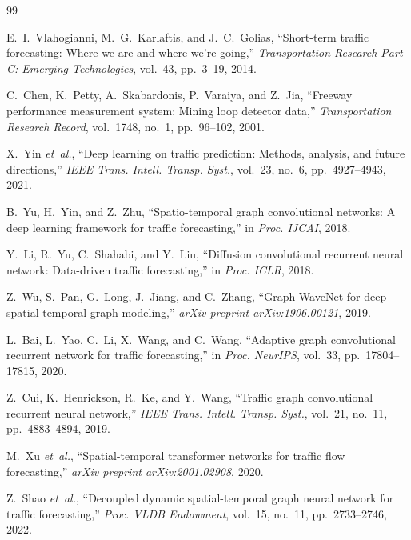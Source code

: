 \documentclass[journal]{IEEEtran}
\begin{document}

% 

\begin{thebibliography}{99}

E.~I.~Vlahogianni, M.~G.~Karlaftis, and J.~C.~Golias,
``Short-term traffic forecasting: Where we are and where we're going,''
\emph{Transportation Research Part C: Emerging Technologies},
vol.~43, pp.~3--19, 2014.

C.~Chen, K.~Petty, A.~Skabardonis, P.~Varaiya, and Z.~Jia,
``Freeway performance measurement system: Mining loop detector data,''
\emph{Transportation Research Record}, vol.~1748, no.~1,
pp.~96--102, 2001.

X.~Yin \emph{et~al.},
``Deep learning on traffic prediction: Methods, analysis, and future directions,''
\emph{IEEE Trans. Intell. Transp. Syst.}, vol.~23, no.~6,
pp.~4927--4943, 2021.

B.~Yu, H.~Yin, and Z.~Zhu,
``Spatio-temporal graph convolutional networks: A deep learning framework for traffic forecasting,''
in \emph{Proc. IJCAI}, 2018.

Y.~Li, R.~Yu, C.~Shahabi, and Y.~Liu,
``Diffusion convolutional recurrent neural network: Data-driven traffic forecasting,''
in \emph{Proc. ICLR}, 2018.

Z.~Wu, S.~Pan, G.~Long, J.~Jiang, and C.~Zhang,
``Graph WaveNet for deep spatial-temporal graph modeling,''
\emph{arXiv preprint arXiv:1906.00121}, 2019.

L.~Bai, L.~Yao, C.~Li, X.~Wang, and C.~Wang,
``Adaptive graph convolutional recurrent network for traffic forecasting,''
in \emph{Proc. NeurIPS}, vol.~33, pp.~17804--17815, 2020.

Z.~Cui, K.~Henrickson, R.~Ke, and Y.~Wang,
``Traffic graph convolutional recurrent neural network,''
\emph{IEEE Trans. Intell. Transp. Syst.}, vol.~21, no.~11,
pp.~4883--4894, 2019.

M.~Xu \emph{et~al.},
``Spatial-temporal transformer networks for traffic flow forecasting,''
\emph{arXiv preprint arXiv:2001.02908}, 2020.

Z.~Shao \emph{et~al.},
``Decoupled dynamic spatial-temporal graph neural network for traffic forecasting,''
\emph{Proc. VLDB Endowment}, vol.~15, no.~11, pp.~2733--2746, 2022.


\end{thebibliography}
\end{document}
